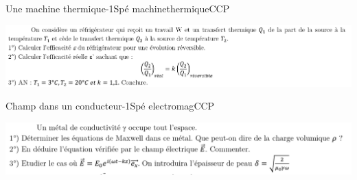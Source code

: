\newpage

\begin{exercise}{Une machine thermique}{-1}{Spé}
{machinethermique}{CCP}

\includegraphics[width=\linewidth]{oraux/CCP/exo_CCP_machinethermique.png}

\end{exercise}

\begin{exercise}{Champ dans un conducteur}{-1}{Spé}
{electromag}{CCP}

\includegraphics[width=\linewidth]{oraux/CCP/exo_CCP_conducteur.png}

\end{exercise}


